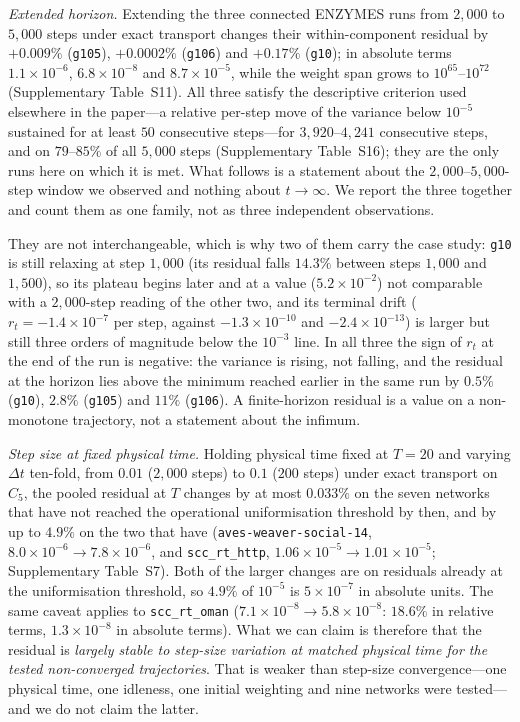 \documentclass[11pt]{article}
\begin{document}
\emph{Extended horizon.} Extending the three connected {ENZYMES} runs from
$2{,}000$ to $5{,}000$ steps under exact transport changes their
within-component residual by $+0.009\%$ (\texttt{g105}), $+0.0002\%$
(\texttt{g106}) and $+0.17\%$ (\texttt{g10}); in absolute terms
$1.1\times10^{-6}$, $6.8\times10^{-8}$ and $8.7\times10^{-5}$, while the
weight span grows to $10^{65}$--$10^{72}$
(Supplementary Table~S11). All three satisfy the descriptive criterion used
elsewhere in the paper---a relative per-step move of the variance below
$10^{-5}$ sustained for at least $50$ consecutive steps---for
$3{,}920$--$4{,}241$ consecutive steps, and on $79$--$85\%$ of all $5{,}000$
steps (Supplementary Table~S16); they are the only runs here on which it is
met. What follows is a statement about the $2{,}000$--$5{,}000$-step window we
observed and nothing about $t\to\infty$. We report the three together and count
them as one family, not as three independent observations.

They are not interchangeable, which is why two of them carry the case
study: \texttt{g10} is still relaxing at step $1{,}000$ (its residual falls
$14.3\%$ between steps $1{,}000$ and $1{,}500$), so its plateau begins later
and at a value ($5.2\times10^{-2}$) not comparable with a $2{,}000$-step
reading of the other two, and its terminal drift ($r_t=-1.4\times10^{-7}$ per
step, against $-1.3\times10^{-10}$ and $-2.4\times10^{-13}$) is larger but
still three orders of magnitude below the $10^{-3}$ line. In all three the sign of $r_t$ at the end of the run is negative: the variance is rising, not falling, and the residual at the
horizon lies above the minimum reached earlier in the same run by $0.5\%$
(\texttt{g10}), $2.8\%$ (\texttt{g105}) and $11\%$ (\texttt{g106}). A
finite-horizon residual is a value on a non-monotone trajectory, not a
statement about the infimum.

\emph{Step size at fixed physical time.} Holding physical time fixed at $T=20$
and varying $\Delta t$ ten-fold, from $0.01$ ($2{,}000$ steps) to $0.1$ ($200$
steps) under exact transport on $C_5$, the pooled residual at $T$ changes by
at most $0.033\%$ on the seven networks that have not reached the operational
uniformisation threshold by then, and by up to $4.9\%$ on the two that have
(\texttt{aves-weaver-social-14}, $8.0\times10^{-6}\to7.8\times10^{-6}$, and
\texttt{scc\_rt\_http}, $1.06\times10^{-5}\to1.01\times10^{-5}$;
Supplementary Table~S7). Both of the larger changes are on residuals already at
the uniformisation threshold, so $4.9\%$ of $10^{-5}$ is $5\times10^{-7}$ in
absolute units. The same caveat applies to \texttt{scc\_rt\_oman}
($7.1\times10^{-8}\to5.8\times10^{-8}$: $18.6\%$ in relative terms,
$1.3\times10^{-8}$ in absolute terms). What we can claim is therefore that
the residual is \emph{largely stable to step-size variation at matched physical
time for the tested non-converged trajectories}. That is weaker than
step-size convergence---one physical time, one idleness, one initial weighting
and nine networks were tested---and we do not claim the latter.
\end{document}
